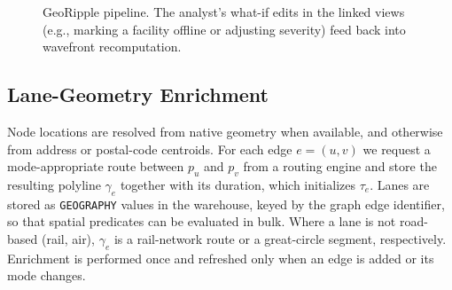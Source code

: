 \documentclass[conference]{IEEEtran}
\begin{document}
\begin{figure}[t]
\centering
{}
\caption{GeoRipple pipeline. The analyst's what-if edits in the linked
views (e.g., marking a facility offline or adjusting severity) feed back
into wavefront recomputation.}
\label{fig:pipeline}
\end{figure}

\subsection{Lane-Geometry Enrichment}\label{sec:lanes}
Node locations are resolved from native geometry when available, and
otherwise from address or postal-code centroids. For each edge $e=(u,v)$
we request a mode-appropriate route between $p_u$ and $p_v$ from a
routing engine and store the resulting polyline $\gamma_e$ together with
its duration, which initializes $\tau_e$. Lanes are stored as
\texttt{GEOGRAPHY} values in the warehouse, keyed by the graph edge
identifier, so that spatial predicates can be evaluated in bulk. Where a
lane is not road-based (rail, air), $\gamma_e$ is a rail-network route or
a great-circle segment, respectively. Enrichment is performed once and
refreshed only when an edge is added or its mode changes.
\end{document}
